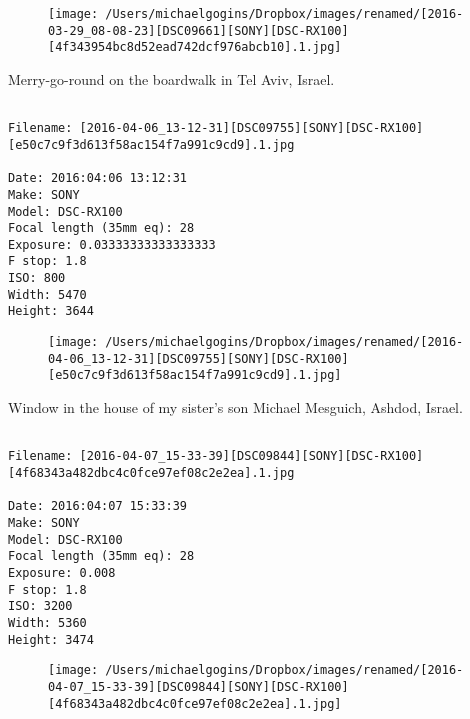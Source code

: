 \begin{figure}
\texttt{[image: /Users/michaelgogins/Dropbox/images/renamed/[2016-03-29\_08-08-23][DSC09661][SONY][DSC-RX100][4f343954bc8d52ead742dcf976abcb10].1.jpg]}
\end{figure}
    
\clearpage
\onecolumn
\noindent Merry-go-round on the boardwalk in Tel Aviv, Israel.
\noindent
\begin{lstlisting}

Filename: [2016-04-06_13-12-31][DSC09755][SONY][DSC-RX100][e50c7c9f3d613f58ac154f7a991c9cd9].1.jpg

Date: 2016:04:06 13:12:31
Make: SONY
Model: DSC-RX100
Focal length (35mm eq): 28
Exposure: 0.03333333333333333
F stop: 1.8
ISO: 800
Width: 5470
Height: 3644
\end{lstlisting}
\clearpage

\begin{figure}
\texttt{[image: /Users/michaelgogins/Dropbox/images/renamed/[2016-04-06\_13-12-31][DSC09755][SONY][DSC-RX100][e50c7c9f3d613f58ac154f7a991c9cd9].1.jpg]}
\end{figure}
    
\clearpage
\onecolumn
\noindent Window in the house of my sister's son Michael Mesguich, Ashdod, Israel.
\noindent
\begin{lstlisting}

Filename: [2016-04-07_15-33-39][DSC09844][SONY][DSC-RX100][4f68343a482dbc4c0fce97ef08c2e2ea].1.jpg

Date: 2016:04:07 15:33:39
Make: SONY
Model: DSC-RX100
Focal length (35mm eq): 28
Exposure: 0.008
F stop: 1.8
ISO: 3200
Width: 5360
Height: 3474
\end{lstlisting}
\clearpage

\begin{figure}
\texttt{[image: /Users/michaelgogins/Dropbox/images/renamed/[2016-04-07\_15-33-39][DSC09844][SONY][DSC-RX100][4f68343a482dbc4c0fce97ef08c2e2ea].1.jpg]}
\end{figure}
    
